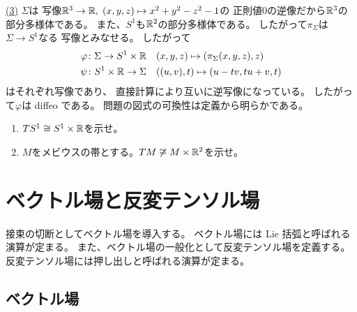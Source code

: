 \documentclass[report]{jlreq}
\begin{document}
\begin{answer}
    \uline{(3)} \quad
    $\Sigma$は
    {\smooth}写像$\mathbb{R}^3 \to \mathbb{R}, \; (x, y, z) \mapsto x^2 + y^2 - z^2 - 1$の
    正則値$0$の逆像だから$\mathbb{R}^3$の部分多様体である。
    また、$S^1$も$\mathbb{R}^2$の部分多様体である。
    したがって$\pi_\Sigma$は$\Sigma \to S^1$なる
    {\smooth}写像とみなせる。
    したがって
    \begin{alignat}{1}
        \varphi &\colon \Sigma \to S^1 \times \mathbb{R}
            \quad
            (x, y, z) \mapsto (\pi_\Sigma(x, y, z), z) \\
        \psi &\colon S^1 \times \mathbb{R} \to \Sigma
            \quad
            ((u, v), t) \mapsto (u - tv, tu + v, t)
    \end{alignat}
    はそれぞれ{\smooth}写像であり、
    直接計算により互いに逆写像になっている。
    したがって$\varphi$は diffeo である。
    問題の図式の可換性は定義から明らかである。
\end{answer}

\begin{problem}
    \begin{enumerate}
        \item $TS^1 \cong S^1 \times \mathbb{R}$を示せ。
        \item $M$をメビウスの帯とする。$TM \not\cong M \times \mathbb{R}^2$を示せ。
    \end{enumerate}
\end{problem}

\begin{answer}
    \TODO{}
\end{answer}




%
\newpage
\chapter{ベクトル場と反変テンソル場}


接束の切断としてベクトル場を導入する。
ベクトル場には Lie 括弧と呼ばれる演算が定まる。
また、ベクトル場の一般化として反変テンソル場を定義する。
反変テンソル場には押し出しと呼ばれる演算が定まる。

%
\section{ベクトル場}
\end{document}
